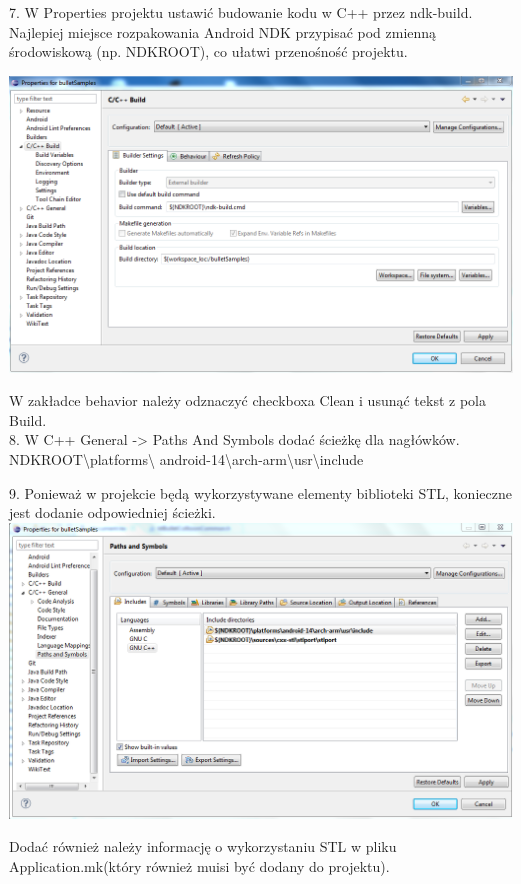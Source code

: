 \documentclass[12pt]{article}
\begin{document}
  7. W Properties projektu ustawić budowanie kodu w C++ przez ndk-build.
  Najlepiej miejsce rozpakowania Android NDK przypisać pod zmienną środowiskową
  (np. NDKROOT), co ułatwi przenośność projektu.
  
  \includegraphics[width=\textwidth]{./img/properties.png}
  
  W zakładce behavior należy odznaczyć checkboxa Clean i usunąć tekst z pola
  Build.\\
  8. W C++ General -> Paths And Symbols dodać ścieżkę dla nagłówków.
  {NDKROOT}\backslash platforms\backslash
  android-14\backslash arch-arm\backslash usr\backslash include
  
  9. Ponieważ w projekcie będą wykorzystywane elementy biblioteki STL, konieczne
  jest dodanie odpowiedniej ścieżki.\\
  
  \includegraphics[width=\textwidth]{./img/ndkroot.png}
  
  Dodać również należy informację o wykorzystaniu STL w pliku
  Application.mk(który również muisi być dodany do projektu).
\end{document}
